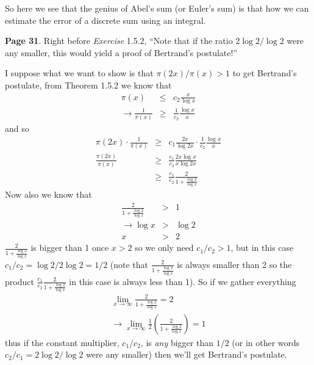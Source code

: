 \documentclass[aps,preprint,preprintnumbers,nofootinbib,showpacs,prd]{revtex4-1}
\newcommand{\nbea}{\begin{eqnarray*}}
\newcommand{\neea}{\end{eqnarray*}}
\begin{document}
So here we see that the genius of Abel's sum (or Euler's sum) is that how we can estimate the error of a discrete sum using an integral.





{\bf Page 31}. Right before {\it Exercise} 1.5.2, ``Note that if the ratio $2 \log 2/ \log 2$ were any smaller, this would yield a proof of Bertrand’s postulate!'' 

I suppose what we want to show is that $\pi(2x)/\pi(x) > 1$ to get Bertrand's postulate, from Theorem 1.5.2 we know that
%
\nbea
\pi(x) & \le & c_2 \frac{x}{\log x} \\
\to \frac{1}{\pi(x)} & \ge & \frac{1}{c_2} \frac{\log x}{x}
\neea
%
and so
%
\nbea
\pi(2x) \cdot \frac{1}{\pi(x)} & \ge & c_1 \frac{2x}{\log 2x} \cdot \frac{1}{c_2} \frac{\log x}{x} \\
\frac{\pi(2x)}{\pi(x)}& \ge & \frac{c_1}{c_2} \frac{2x \log x}{x \log 2x} \\
& \ge & \frac{c_1}{c_2} \frac{2}{1 + \frac{\log 2}{\log x}}
\neea
%
Now also we know that
%
\nbea
\frac{2}{1 + \frac{\log 2}{\log x}} & > & 1 \\
\to \log x & > & \log 2 \\
x & > & 2
\neea
%
$\frac{2}{1 + \frac{\log 2}{\log x}}$ is bigger than 1 once $x > 2$ so we only need $c_1 / c_2 > 1$, but in this case $c_1 / c_2 = \log 2 / 2 \log 2 = 1/2$ (note that $\frac{2}{1 + \frac{\log 2}{\log x}}$ is always smaller than 2 so the product $\frac{c_1}{c_2}\frac{2}{1 + \frac{\log 2}{\log x}}$ in this case is always less than 1). So if we gather everything
%
\nbea
\lim_{x\to\infty} \frac{2}{1 + \frac{\log 2}{\log x}} = 2 \\
\to \lim_{x\to\infty} \frac{1}{2} \left (\frac{2}{1 + \frac{\log 2}{\log x}} \right ) = 1
\neea
%
thus if the constant multiplier, $c_1/c_2$, is {\it any} bigger than $1/2$ (or in other words $c_2/c_1 = 2 \log 2/\log 2$ were any smaller) then we'll get Bertrand's postulate.
\end{document}
